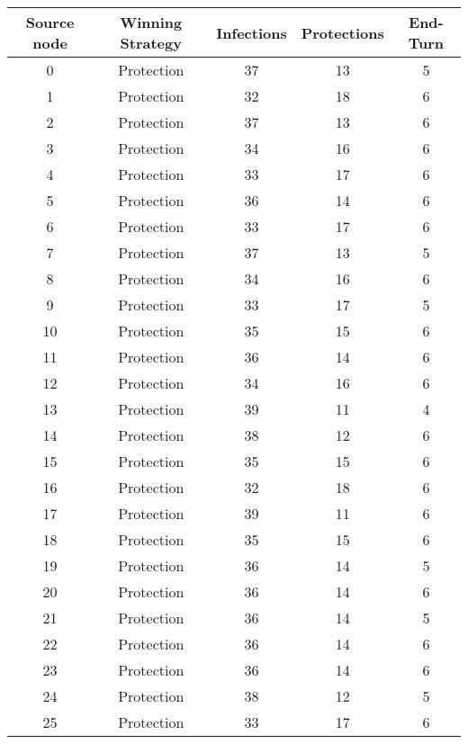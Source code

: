 \documentclass[results.tex]{subfiles}
\begin{document}
\begin{center}
  \begin{tabular}{| c || c | c | c | c |}
    \hline
    {\bfseries Source node} & {\bfseries Winning Strategy} & {\bfseries Infections} & {\bfseries Protections} & {\bfseries End-Turn} \\  %
    \hline\hline
    0 & Protection & 37 & 13 & 5 \\ 
    \hline
    1 & Protection & 32 & 18 & 6 \\ 
    \hline
    2 & Protection & 37 & 13 & 6 \\ 
    \hline
    3 & Protection & 34 & 16 & 6 \\ 
    \hline
    4 & Protection & 33 & 17 & 6 \\ 
    \hline
    5 & Protection & 36 & 14 & 6 \\ 
    \hline
    6 & Protection & 33 & 17 & 6 \\ 
    \hline
    7 & Protection & 37 & 13 & 5 \\ 
    \hline
    8 & Protection & 34 & 16 & 6 \\ 
    \hline
    9 & Protection & 33 & 17 & 5 \\ 
    \hline
    10 & Protection & 35 & 15 & 6 \\ 
    \hline
    11 & Protection & 36 & 14 & 6 \\ 
    \hline
    12 & Protection & 34 & 16 & 6 \\ 
    \hline
    13 & Protection & 39 & 11 & 4 \\ 
    \hline
    14 & Protection & 38 & 12 & 6 \\ 
    \hline
    15 & Protection & 35 & 15 & 6 \\ 
    \hline
    16 & Protection & 32 & 18 & 6 \\ 
    \hline
    17 & Protection & 39 & 11 & 6 \\ 
    \hline
    18 & Protection & 35 & 15 & 6 \\ 
    \hline
    19 & Protection & 36 & 14 & 5 \\ 
    \hline
    20 & Protection & 36 & 14 & 6 \\ 
    \hline
    21 & Protection & 36 & 14 & 5 \\ 
    \hline
    22 & Protection & 36 & 14 & 6 \\ 
    \hline
    23 & Protection & 36 & 14 & 6 \\ 
    \hline
    24 & Protection & 38 & 12 & 5 \\ 
    \hline
    25 & Protection & 33 & 17 & 6 \\ 

\end{tabular}
\end{center}
\end{document}
